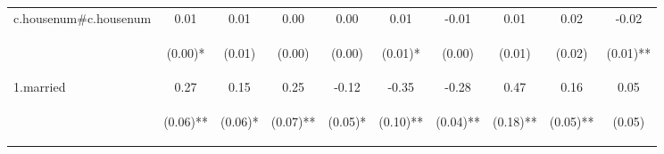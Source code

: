 \begin{center}
\begin{tabular}{lccccccccc}
\noalign{\smallskip}c.housenum\#c.housenum & 0.01 & 0.01 & 0.00 & 0.00 & 0.01 & -0.01 & 0.01 & 0.02 & -0.02\\
 & \begin{footnotesize}(0.00)*\end{footnotesize} & \begin{footnotesize}(0.01)\end{footnotesize} & \begin{footnotesize}(0.00)\end{footnotesize} & \begin{footnotesize}(0.00)\end{footnotesize} & \begin{footnotesize}(0.01)*\end{footnotesize} & \begin{footnotesize}(0.00)\end{footnotesize} & \begin{footnotesize}(0.01)\end{footnotesize} & \begin{footnotesize}(0.02)\end{footnotesize} & \begin{footnotesize}(0.01)**\end{footnotesize}\\
\noalign{\smallskip}1.married & 0.27 & 0.15 & 0.25 & -0.12 & -0.35 & -0.28 & 0.47 & 0.16 & 0.05\\
 & \begin{footnotesize}(0.06)**\end{footnotesize} & \begin{footnotesize}(0.06)*\end{footnotesize} & \begin{footnotesize}(0.07)**\end{footnotesize} & \begin{footnotesize}(0.05)*\end{footnotesize} & \begin{footnotesize}(0.10)**\end{footnotesize} & \begin{footnotesize}(0.04)**\end{footnotesize} & \begin{footnotesize}(0.18)**\end{footnotesize} & \begin{footnotesize}(0.05)**\end{footnotesize} & \begin{footnotesize}(0.05)\end{footnotesize}\\

\end{tabular}
\end{center}
